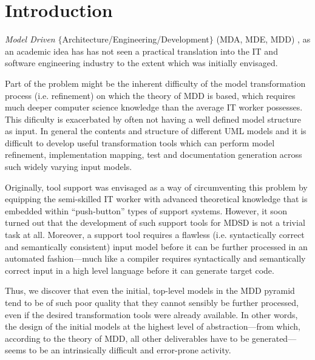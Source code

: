 
\section{Introduction}
\label{sec:Introduction}

\emph{Model Driven} $\{$Architecture/Engineering/Development$\}$ (MDA, MDE, MDD)
\cite{schmidt:modelDrivenEngineering, braek:modelDrivenServiceEngineering, frankel_2003:enterpriseMDA},
 as an academic idea has has not seen a practical translation into the IT and software engineering industry to the extent which was initially envisaged. 

Part of the problem might be the inherent difficulty of the model transformation  process (i.e. refinement) on which the theory of MDD is based, which requires much deeper computer science knowledge than the average IT worker possesses. This dificulty is exacerbated by often not having a well defined model structure as input. In general the contents and structure of different UML models and it is difficult to develop useful transformation tools which can perform model refinement, implementation mapping, test and documentation generation across such widely varying input models.

Originally, tool support was envisaged as a way of circumventing this problem by equipping the semi-skilled IT worker with advanced theoretical knowledge that is embedded within ``push-button'' types of support systems. However, it soon turned out that the development of such support tools for MDSD is not a trivial task at all. Moreover, a support tool requires a flawless (i.e. syntactically correct and semantically consistent) input model before it can be further processed in an automated fashion---much like a compiler requires syntactically and semantically correct input in a high level language before it can generate target code.

Thus, we discover that even the initial, top-level models in the MDD pyramid tend to be of such poor quality that they cannot sensibly be further processed, even if the desired transformation tools were already available. In other words, the design of the initial models at the highest level of abstraction---from which, according to the theory of MDD, all other deliverables have to be generated---seems to be an intrinsically difficult and error-prone activity.

